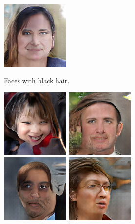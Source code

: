 \begin{figure}[!h]
\begin{subfigure}[b]{\textwidth}
{            \includegraphics[scale=0.485]{figures/ffhq/labeled-hair-black/ffhq128x128_image013.png}
        }
        \caption{Faces with black hair.}
        \vspace{0.1cm}
    \end{subfigure}
    \begin{subfigure}[b]{\textwidth}
        \centerline{
            \includegraphics[scale=0.485]{figures/ffhq/labeled-hair-brown/ffhq128x128_image000.png}
            \includegraphics[scale=0.485]{figures/ffhq/labeled-hair-brown/ffhq128x128_image001.png}
            \includegraphics[scale=0.485]{figures/ffhq/labeled-hair-brown/ffhq128x128_image004.png}
            \includegraphics[scale=0.485]{figures/ffhq/labeled-hair-brown/ffhq128x128_image008.png}
}
\end{subfigure}
\end{figure}
